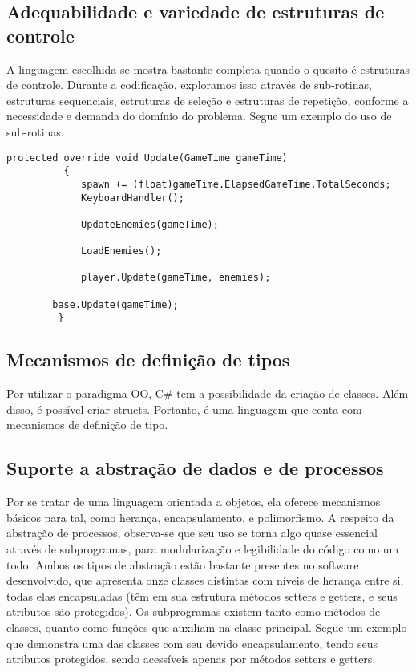 \documentclass[rel_mlp]{iiufrgs}
\begin{document}
\subsection{Adequabilidade e variedade de estruturas de controle}

A linguagem escolhida se mostra bastante completa quando o quesito é estruturas de controle. Durante a codificação, exploramos isso através de sub-rotinas, estruturas sequenciais, estruturas de seleção e estruturas de repetição, conforme a necessidade e demanda do domínio do problema. Segue um exemplo do uso de sub-rotinas.

\begin{lstlisting}[caption=Trecho de código C\# retirado da implementação deste trabalho, label=lst:test]
protected override void Update(GameTime gameTime)
      	  {
           	 spawn += (float)gameTime.ElapsedGameTime.TotalSeconds;
           	 KeyboardHandler();

           	 UpdateEnemies(gameTime);

           	 LoadEnemies();

           	 player.Update(gameTime, enemies);

		base.Update(gameTime);
       	 }
\end{lstlisting}

\subsection{Mecanismos de definição de tipos}

Por utilizar o paradigma OO, C\# tem a possibilidade da criação de classes. Além disso, é possível criar structs. Portanto, é uma linguagem que conta com mecanismos de definição de tipo.

\subsection{Suporte a abstração de dados e de processos}

Por se tratar de uma linguagem orientada a objetos, ela oferece mecanismos básicos para tal, como herança, encapsulamento, e polimorfismo. A respeito da abstração de processos, observa-se que seu uso se torna algo quase essencial através de subprogramas, para modularização e legibilidade do código como um todo. Ambos os tipos de abstração estão bastante presentes no software desenvolvido, que apresenta onze classes distintas com níveis de herança entre si, todas elas encapsuladas (têm em sua estrutura métodos setters e getters, e seus atributos são protegidos). Os subprogramas existem tanto como métodos de classes, quanto como funções que auxiliam na classe principal. Segue um exemplo que demonstra uma das classes com seu devido encapsulamento, tendo seus atributos protegidos, sendo acessíveis apenas por métodos setters e getters.
\end{document}
